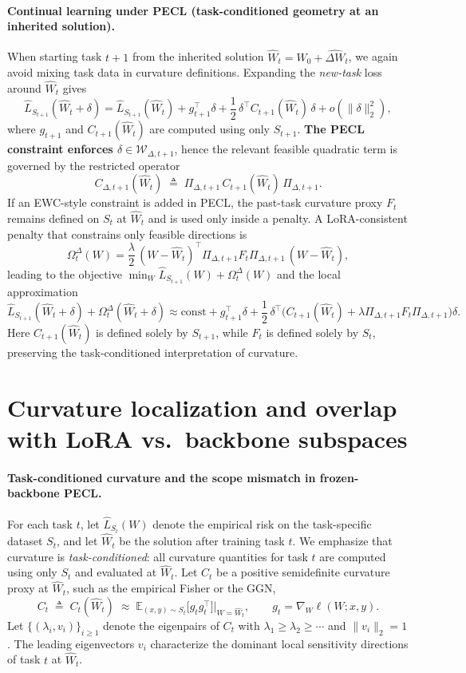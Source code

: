 \documentclass{article}
\theoremstyle{plain}
\theoremstyle{definition}
\theoremstyle{remark}
\begin{document}
\paragraph{Continual learning under PECL (task-conditioned geometry at an inherited solution).}
When starting task $t+1$ from the inherited solution $\hat W_t=W_0+\hat{\Delta W}_t$, we again avoid mixing task data in curvature definitions. Expanding the \emph{new-task} loss around $\hat W_t$ gives
$$
\hat L_{S_{t+1}}(\hat W_t+\delta)
=
\hat L_{S_{t+1}}(\hat W_t)
+
g_{t+1}^\top \delta
+
\frac12\,\delta^\top C_{t+1}(\hat W_t)\,\delta
+
o(\|\delta\|_2^2),
$$
where $g_{t+1}$ and $C_{t+1}(\hat W_t)$ are computed using only $S_{t+1}$. \textbf{The PECL constraint enforces $\delta\in\mathcal W_{\Delta,t+1}$}, hence the relevant feasible quadratic term is governed by the restricted operator
$$
C_{\Delta,t+1}(\hat W_t)
\;\triangleq\;
\Pi_{\Delta,t+1}\,C_{t+1}(\hat W_t)\,\Pi_{\Delta,t+1}.
$$
If an EWC-style constraint is added in PECL, the past-task curvature proxy $F_t$ remains defined on $S_t$ at $\hat W_t$ and is used only inside a penalty. A LoRA-consistent penalty that constrains only feasible directions is
$$
\Omega_t^{\Delta}(W)
=
\frac{\lambda}{2}\,(W-\hat W_t)^\top \Pi_{\Delta,t+1}F_t\Pi_{\Delta,t+1}\,(W-\hat W_t),
$$
leading to the objective $\min_W \hat L_{S_{t+1}}(W)+\Omega_t^{\Delta}(W)$ and the local approximation
$$
\hat L_{S_{t+1}}(\hat W_t+\delta)+\Omega_t^{\Delta}(\hat W_t+\delta)
\approx
\text{const}
+
g_{t+1}^\top \delta
+
\frac12\,\delta^\top\Big(C_{t+1}(\hat W_t)+\lambda \Pi_{\Delta,t+1}F_t\Pi_{\Delta,t+1}\Big)\delta.
$$
Here $C_{t+1}(\hat W_t)$ is defined solely by $S_{t+1}$, while $F_t$ is defined solely by $S_t$, preserving the task-conditioned interpretation of curvature.


\section{Curvature localization and overlap with LoRA vs.\ backbone subspaces}

\paragraph{Task-conditioned curvature and the scope mismatch in frozen-backbone PECL.}
For each task $t$, let $\hat L_{S_t}(W)$ denote the empirical risk on the task-specific dataset $S_t$, and let $\hat W_t$ be the solution after training task $t$. We emphasize that curvature is \emph{task-conditioned}: all curvature quantities for task $t$ are computed using only $S_t$ and evaluated at $\hat W_t$. Let $C_t$ be a positive semidefinite curvature proxy at $\hat W_t$, such as the empirical Fisher or the GGN,
$$
C_t \;\triangleq\; C_t(\hat W_t)\;\approx\; \mathbb E_{(x,y)\sim S_t}\big[g_t g_t^\top\big]\Big|_{W=\hat W_t},
\qquad g_t=\nabla_W \ell(W;x,y).
$$
Let $\{(\lambda_i,v_i)\}_{i\ge 1}$ denote the eigenpairs of $C_t$ with $\lambda_1\ge\lambda_2\ge\cdots$ and $\|v_i\|_2=1$. The leading eigenvectors $v_i$ characterize the dominant local sensitivity directions of task $t$ at $\hat W_t$.
\end{document}
